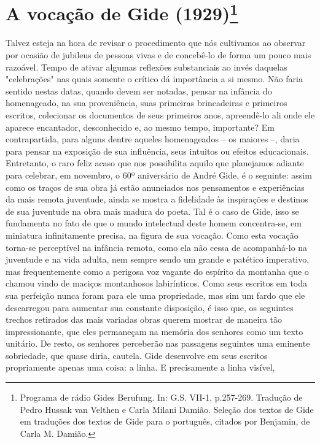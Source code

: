 \chapter{A vocação de Gide (1929)\footnote[*]{Programa
  de rádio Gides Berufung. In: G.S. VII-1, p.257-269. Tradução de Pedro
  Hussak van Velthen e Carla Milani Damião. Seleção dos textos de Gide
  em traduções dos textos de Gide para o português, citados por
  Benjamin, de Carla M. Damião.}}

Talvez esteja na hora de revisar o procedimento que nós cultivamos ao
observar por ocasião de jubileus de pessoas vivas e de concebê-lo de
forma um pouco mais razoável. Tempo de ativar algumas reflexões
substanciais ao invés daquelas "celebrações" nas quais somente o crítico
dá importância a si mesmo. Não faria sentido nestas datas, quando devem
ser notadas, pensar na infância do homenageado, na sua proveniência,
suas primeiras brincadeiras e primeiros escritos, colecionar os
documentos de seus primeiros anos, apreendê-lo ali onde ele aparece
encantador, desconhecido e, ao mesmo tempo, importante? Em
contrapartida, para alguns dentre aqueles homenageados -- os maiores --,
daria para pensar na exposição de sua influência, seus intuitos ou
efeitos educacionais. Entretanto, o raro feliz acaso que nos possibilita
aquilo que planejamos adiante para celebrar, em novembro, o 60º
aniversário de André Gide, é o seguinte: assim como os traços de sua
obra já estão anunciados nos pensamentos e experiências da mais remota
juventude, ainda se mostra a fidelidade às inspirações e destinos de sua
juventude na obra mais madura do poeta. Tal é o caso de Gide, isso se
fundamenta no fato de que o mundo intelectual deste homem concentra-se,
em miniatura infinitamente precisa, na figura de sua vocação. Como esta
vocação torna-se perceptível na infância remota, como ela não cessa de
acompanhá-lo na juventude e na vida adulta, nem sempre sendo um grande e
patético imperativo, mas frequentemente como a perigosa voz vagante do
espírito da montanha que o chamou vindo de maciços montanhosos
labirínticos. Como seus escritos em toda sua perfeição nunca foram para
ele uma propriedade, mas sim um fardo que ele descarregou para aumentar
sua constante disposição, é isso que, os seguintes trechos retirados das
mais variadas obras querem mostrar de maneira tão impressionante, que
eles permaneçam na memória dos senhores como um texto unitário. De
resto, os senhores perceberão nas passagens seguintes uma eminente
sobriedade, que quase diria, cautela. Gide desenvolve em seus escritos
propriamente apenas uma coisa: a linha. E precisamente a linha visível,

